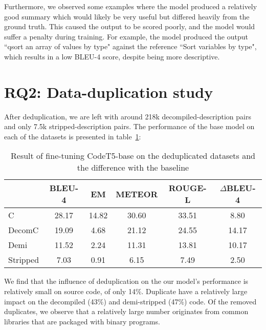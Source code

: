 Furthermore, we observed some examples where the model produced a relatively good summary which would likely be very useful but differed heavily from the ground truth. This caused the output to be scored poorly, and the model would suffer a penalty during training. For example, the model produced the output ``qsort an array of values by type" against the reference ``Sort variables by type", which results in a low BLEU-4 score, despite being more descriptive.

\section{RQ2: Data-duplication study}
After deduplication, we are left with around 218k decompiled-description pairs and only 7.5k stripped-description pairs. The performance of the base model on each of the datasets is presented in table~\ref{tab:deduplicated}:
\begin{table}[htb]
\centering
\begin{tabular}{lcccc|c} 
\hline
\rowcolor[rgb]{0.729,0.729,0.729} \multicolumn{1}{|l}{\textbf{Deduplicated}} & BLEU-4 & EM    & METEOR & ROUGE-L & \multicolumn{1}{c|}{$\Delta$BLEU-4}  \\ 
\hline
C                                                                            & 28.17  & 14.82 & 30.60   & 33.51   & 8.80                                 \\
DecomC                                                                       & 19.09  & 4.68  & 21.12  & 24.55   & 14.17                                \\
Demi                                                                         & 11.52  & 2.24  & 11.31  & 13.81   & 10.17                                \\
Stripped                                                                     & 7.03   & 0.91  & 6.15   & 7.49    & 2.50                                
\end{tabular}
\caption{Result of fine-tuning CodeT5-base on the deduplicated datasets and the difference with the baseline}
\label{tab:deduplicated}
\end{table}

We find that the influence of deduplication on the our model's performance is relatively small on source code, of only 14\%. Duplicate have a relatively large impact on the decompiled (43\%) and demi-stripped (47\%) code. 
Of the removed duplicates, we observe that a relatively large number originates from common libraries that are packaged with binary programs. 

